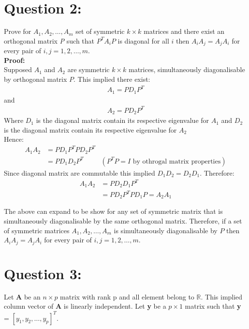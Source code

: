 \documentclass[12 pt, a4paper]{article}
\begin{document}
\section*{Question 2:} 

Prove for $A_1,A_2, \ldots,  A_m$ set of symmetric $k \times k$ matrices and there exist an orthogonal matrix \textit{P} such that $P^TA_iP$ is diagonal for all $i$ then $A_iA_j=A_jA_i$ for every pair of $i,j = 1,2,\ldots, m$.\\


\noindent \textbf{Proof:}\\
Supposed $A_1$ and $A_2$ are symmetric $k \times k$ matrices,  simultaneously diagonalisable by orthogonal matrix $P$.  This implied there exist:
\begin{align*}
A_1= PD_1P^T
\end{align*}
and
\begin{align*}
A_2 = PD_2P^T
\end{align*}
Where $D_1$ is the diagonal matrix contain its respective eigenvalue for $A_1$ and  $D_2$ is the diagonal matrix contain its respective eigenvalue for $A_2$ \\

\noindent Hence:
\begin{align*}
A_1A_2 &=  PD_1P^TPD_2P^T \\
 & = PD_1D_2P^T & (P^TP = I \text{ by othrogal matrix properties})
\end{align*}
Since diagonal matrix are commutable this implied $D_1D_2=D_2D_1$. Therefore: \\
\begin{align*}
A_1A_2 &= PD_2D_1P^T \\
&= PD_2P^TPD_1P=A_2A_1
\end{align*}

The above can expand to be show for any set of symmetric matrix that is simultaneously diagonalisable by the same orthogonal matrix.  Therefore, if a set of symmetric matrices $A_1,A_2, \ldots,  A_m$ is simultaneously diagonalisable by $P$ then $A_iA_j=A_jA_i$ for every pair of $i,j = 1,2,\ldots, m$.

\section*{Question 3:}
Let \textbf{A} be an $n \times p$ matrix with rank p and all element belong to $\mathbb{R}$. This implied column vector of \textbf{A} is linearly independent.   Let \textbf{y} be a $p \times 1$ matrix such that \textbf{y} = $[y_1,y_2, \ldots,y_p]^T$. \\
\end{document}
